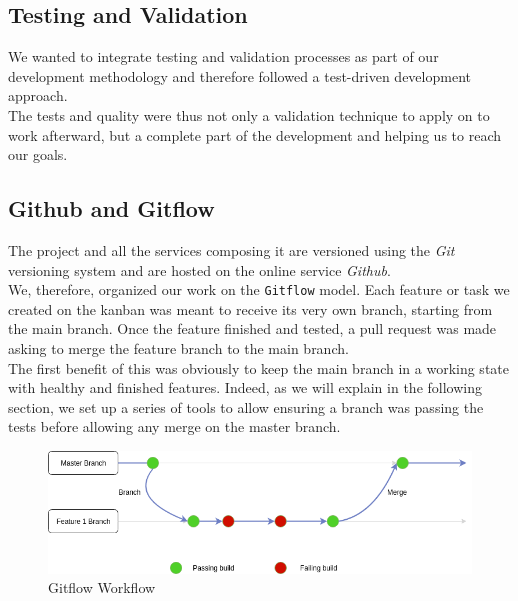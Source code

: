 \documentclass{eplmastersthesis}
\begin{document}
        \subsection{Testing and Validation}

          We wanted to integrate testing and
          validation processes as part of our development methodology and
          therefore followed a test-driven development approach.\\
          The tests and quality were thus not only a validation technique to
          apply on to work afterward, but a complete part of the development
          and helping us to reach our goals.

        \subsection{Github and Gitflow}

          The project and all the services composing it are versioned using the
          \textit{Git} versioning system and are hosted on the online service
          \textit{Github}.\\
          We, therefore, organized our work on the \texttt{Gitflow} model. Each feature or
          task we created on the kanban was meant to receive its very own
          branch, starting from the main branch.
          Once the feature finished and tested, a pull request was made asking
          to merge the feature branch to the main branch.\\
          The first benefit of this was obviously to keep the main branch in
          a working state with healthy and finished features. Indeed, as
          we will explain in the following section, we set up a series of tools
          to allow ensuring a branch was passing the tests before allowing any
          merge on the master branch.\\

          \begin{figure}[H]
            \centering
            \includegraphics[scale=0.6]{figures/gitflow.png}
            \caption{\label{gitworkflow} Gitflow Workflow}
          \end{figure}
\end{document}
